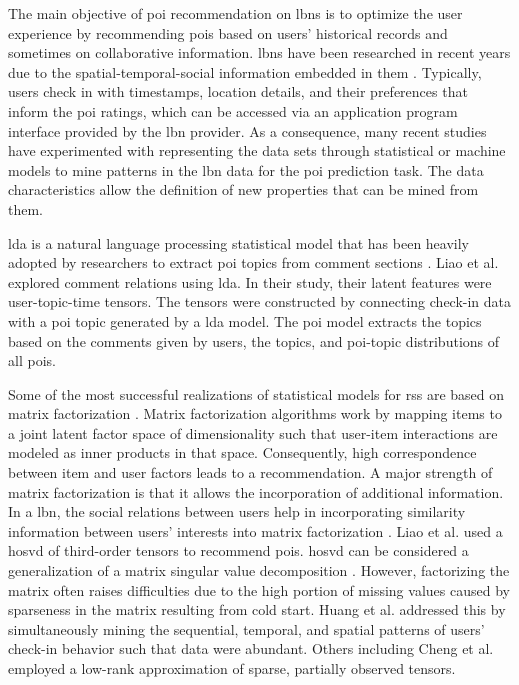 The main objective of \gls{poi} recommendation on \glspl{lbn} is to optimize the user experience by recommending \glspl{poi} based on users’ historical records and sometimes on collaborative information. \Glspl{lbn} have been researched in recent years due to the spatial-temporal-social information embedded in them \parencite{Cheng2011ExploringServices}. Typically, users check in with timestamps, location details, and their preferences that inform the \gls{poi} ratings, which can be accessed via an application program interface provided by the \gls{lbn} provider. As a consequence, many recent studies have experimented with representing the data sets through statistical or machine models to mine patterns in the \gls{lbn} data for the \gls{poi} prediction task. The data characteristics allow the definition of new properties that can be mined from them.

\Gls{lda} is a natural language processing statistical model that has been heavily adopted by researchers to extract \gls{poi} topics from comment sections \parencite{Liao2018POIFactorization, Huang2020Multi-modalNetworks}. Liao et al. \parencite{Liao2018POIFactorization} explored comment relations using \gls{lda}. In their study, their latent features were user-topic-time \glspl{tensor}. The \glspl{tensor} were constructed by connecting check-in data with a \gls{poi} topic generated by a \gls{lda} model. The \gls{poi} model extracts the topics based on the comments given by users, the topics, and \gls{poi}-topic distributions of all \glspl{poi}.

Some of the most successful realizations of statistical models for \glspl{rs} are based on matrix factorization \parencite{Cheng2013WhereRecommendation, Cheng2012FusedNetworks, Chen2018PrivacyFactorization, Gao2013ExploringNetworks, Lian2015Content-AwareData}. Matrix factorization \parencite{Koren2009MatrixSystems} algorithms work by mapping items to a joint latent factor space of dimensionality such that user-item interactions are modeled as inner products in that space. Consequently, high correspondence between item and user factors leads to a recommendation. A major strength of matrix factorization is that it allows the incorporation of additional information. In a \gls{lbn}, the social relations between users help in incorporating similarity information between users’ interests into matrix factorization \parencite{Cheng2013WhereRecommendation, Liao2018POIFactorization, Huang2020Multi-modalNetworks}. Liao et al.\parencite{Liao2018POIFactorization} used a \gls{hosvd} of third-order \glspl{tensor} to recommend \glspl{poi}. \Gls{hosvd} can be considered a generalization of a matrix singular value decomposition \parencite{Vandewalle1990SingularProcessing}. However, factorizing the matrix often raises difficulties due to the high portion of missing values caused by sparseness in the matrix resulting from cold start. Huang et al. \parencite{Huang2020Multi-modalNetworks} addressed this by simultaneously mining the sequential, temporal, and spatial patterns of users’ check-in behavior such that data were abundant. Others including Cheng et al.\parencite{Cheng2013WhereRecommendation} employed a low-rank approximation of sparse, partially observed \glspl{tensor}.

